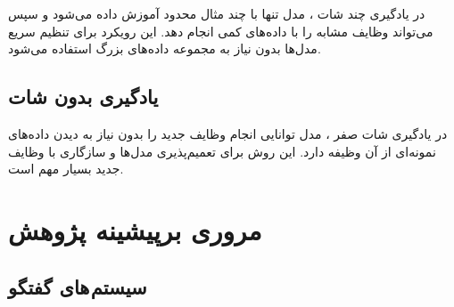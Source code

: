 در یادگیری چند شات%
، مدل تنها با چند مثال محدود آموزش داده می‌شود و سپس می‌تواند وظایف مشابه را با داده‌های کمی انجام دهد. این رویکرد برای تنظیم سریع مدل‌ها بدون نیاز به مجموعه داده‌های بزرگ استفاده می‌شود.

\subsection{یادگیری بدون شات}
در یادگیری شات صفر%
، مدل توانایی انجام وظایف جدید را بدون نیاز به دیدن داده‌های نمونه‌ای از آن وظیفه دارد. این روش برای تعمیم‌پذیری مدل‌ها و سازگاری با وظایف جدید بسیار مهم است.



\section{مروری برپیشینه پژوهش}
\label{BackgroundResearch:my}
\subsection{سیستم های گفتگو}

